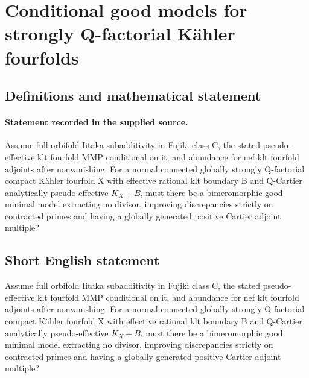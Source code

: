 \documentclass[11pt]{article}
\begin{document}
\section*{Conditional good models for strongly Q-factorial Kähler fourfolds}\label{30007022}
\subsection{Definitions and mathematical statement}
\paragraph{Statement recorded in the supplied source.}
Assume full orbifold Iitaka subadditivity in Fujiki class C, the stated pseudo-effective klt fourfold MMP conditional on it, and abundance for nef klt fourfold adjoints after nonvanishing. For a normal connected globally strongly Q-factorial compact Kähler fourfold X with effective rational klt boundary B and Q-Cartier analytically pseudo-effective $K_X+B$, must there be a bimeromorphic good minimal model extracting no divisor, improving discrepancies strictly on contracted primes and having a globally generated positive Cartier adjoint multiple?
\subsection{Short English statement}
Assume full orbifold Iitaka subadditivity in Fujiki class C, the stated pseudo-effective klt fourfold MMP conditional on it, and abundance for nef klt fourfold adjoints after nonvanishing. For a normal connected globally strongly Q-factorial compact Kähler fourfold X with effective rational klt boundary B and Q-Cartier analytically pseudo-effective $K_X+B$, must there be a bimeromorphic good minimal model extracting no divisor, improving discrepancies strictly on contracted primes and having a globally generated positive Cartier adjoint multiple?
\end{document}
